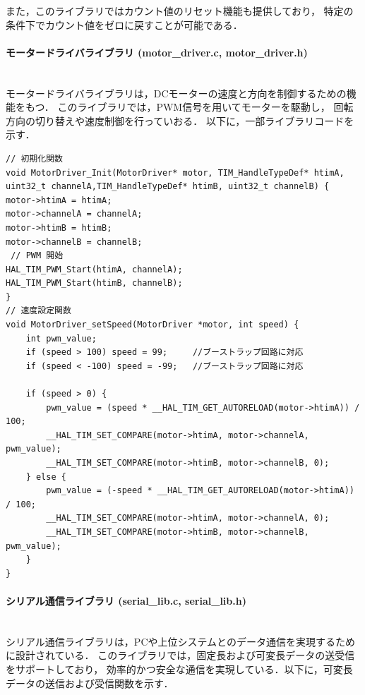 また，このライブラリではカウント値のリセット機能も提供しており，
特定の条件下でカウント値をゼロに戻すことが可能である．

\paragraph{モータードライバライブラリ (motor\_driver.c, motor\_driver.h)}\mbox{}\\
モータードライバライブラリは，DCモーターの速度と方向を制御するための機能をもつ．
このライブラリでは，PWM信号を用いてモーターを駆動し，
回転方向の切り替えや速度制御を行っていおる．
以下に，一部ライブラリコードを示す．

\lstset{language=C, caption=モーターの速度設定 (motor\_driver.c)}

\begin{lstlisting}
// 初期化関数
void MotorDriver_Init(MotorDriver* motor, TIM_HandleTypeDef* htimA, uint32_t channelA,TIM_HandleTypeDef* htimB, uint32_t channelB) {
motor->htimA = htimA;
motor->channelA = channelA;
motor->htimB = htimB;
motor->channelB = channelB;    
 // PWM 開始
HAL_TIM_PWM_Start(htimA, channelA);
HAL_TIM_PWM_Start(htimB, channelB);
}
// 速度設定関数
void MotorDriver_setSpeed(MotorDriver *motor, int speed) {
    int pwm_value;
    if (speed > 100) speed = 99;     //ブーストラップ回路に対応
    if (speed < -100) speed = -99;   //ブーストラップ回路に対応
        
    if (speed > 0) {
        pwm_value = (speed * __HAL_TIM_GET_AUTORELOAD(motor->htimA)) / 100;
        __HAL_TIM_SET_COMPARE(motor->htimA, motor->channelA, pwm_value);
        __HAL_TIM_SET_COMPARE(motor->htimB, motor->channelB, 0);
    } else {
        pwm_value = (-speed * __HAL_TIM_GET_AUTORELOAD(motor->htimA)) / 100;
        __HAL_TIM_SET_COMPARE(motor->htimA, motor->channelA, 0);
        __HAL_TIM_SET_COMPARE(motor->htimB, motor->channelB, pwm_value);
    }
}
\end{lstlisting}


\paragraph{シリアル通信ライブラリ (serial\_lib.c, serial\_lib.h)}\mbox{}\\
シリアル通信ライブラリは，PCや上位システムとのデータ通信を実現するために設計されている．
このライブラリでは，固定長および可変長データの送受信をサポートしており，
効率的かつ安全な通信を実現している．以下に，可変長データの送信および受信関数を示す．


